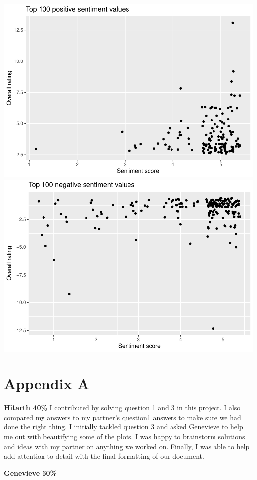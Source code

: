 \documentclass[
  11pt,
]{article}
\begin{document}
\includegraphics[width=0.5\linewidth]{Assignment-STAT702---final_files/figure-latex/top positive and negative sentiment scores, figures-side-1}
\includegraphics[width=0.5\linewidth]{Assignment-STAT702---final_files/figure-latex/top positive and negative sentiment scores, figures-side-2}
\newpage

\hypertarget{appendix-a}{%
\section{Appendix A}\label{appendix-a}}

\textbf{Hitarth 40\%} I contributed by solving question 1 and 3 in this
project. I also compared my answers to my partner's question1 answers to
make sure we had done the right thing. I initially tackled question 3
and asked Genevieve to help me out with beautifying some of the plots. I
was happy to brainstorm solutions and ideas with my partner on anything
we worked on. Finally, I was able to help add attention to detail with
the final formatting of our document.

\textbf{Genevieve 60\%}
\end{document}

